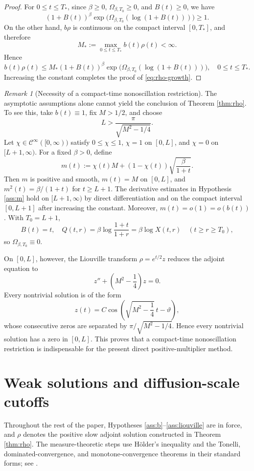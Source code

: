 \documentclass[11pt,reqno]{amsart}
\theoremstyle{definition}
\theoremstyle{remark}
\newtheorem{remark}[theorem]{Remark}
\begin{document}
\begin{proof}
		For $0\leq t\leq T_*$, since $\beta\geq0$,
		$\Omega_{\beta,T_0}\geq0$, and $B(t)\geq0$, we have
		$$
		(1+B(t))^\beta
		\exp\bigl(
		\Omega_{\beta,T_0}(\log(1+B(t)))
		\bigr)
		\geq1.
		$$
		On the other hand, $b\rho$ is continuous on the compact interval
		$[0,T_*]$, and therefore
		$$
		M_*:=
		\max_{0\leq t\leq T_*}b(t)\rho(t)<\infty.
		$$
		Hence
		$$
		b(t)\rho(t)
		\leq
		M_*
		(1+B(t))^\beta
		\exp\bigl(
		\Omega_{\beta,T_0}(\log(1+B(t)))
		\bigr),
		\quad 0\leq t\leq T_*.
		$$
		Increasing the constant completes the proof of
		\eqref{eq:rho-growth}.
	\end{proof}
	
	\begin{remark}[Necessity of a compact-time nonoscillation restriction]
		\label{rem:obstruction}
		The asymptotic assumptions alone cannot yield the conclusion of Theorem \ref{thm:rho}. To see this, take $b(t)\equiv1$, fix $M>1/2$, and choose
		$$
		L>\frac{\pi}{\sqrt{M^2-1/4}}.
		$$
		Let $\chi\in \mathcal{C}^\infty([0,\infty))$ satisfy $0\leq\chi\leq1$, $\chi=1$ on $[0,L]$, and $\chi=0$ on $[L+1,\infty)$. For a fixed $\beta>0$, define
		$$
		m(t):=\chi(t)M+(1-\chi(t))\sqrt{\frac{\beta}{1+t}}.
		$$
		Then $m$ is positive and smooth, $m(t)=M$ on $[0,L]$, and $m^2(t)=\beta/(1+t)$ for $t\geq L+1$. The derivative estimates in Hypothesis \ref{ass:m} hold on $[L+1,\infty)$ by direct differentiation and on the compact interval $[0,L+1]$ after increasing the constant. Moreover, $m(t)=o(1)=o(b(t))$. With $T_0=L+1$,
		$$
		B(t)=t,
		\quad
		Q(t,r)=\beta\log\frac{1+t}{1+r}
		=\beta\log X(t,r)
		\quad(t\geq r\geq T_0),
		$$
		so $\Omega_{\beta,T_0}\equiv0$.
		
		On $[0,L]$, however, the Liouville transform $\rho=e^{t/2}z$ reduces the adjoint equation to
		$$
		z''+\left(M^2-\frac14\right)z=0.
		$$
		Every nontrivial solution is of the form
		$$
		z(t)=C\cos\left(\sqrt{M^2-\frac14}\,t-\vartheta\right),
		$$
		whose consecutive zeros are separated by $\pi/\sqrt{M^2-1/4}$. Hence every nontrivial solution has a zero in $[0,L]$. This proves that a compact-time nonoscillation restriction is indispensable for the present direct positive-multiplier method.
	\end{remark}
	
	\section{Weak solutions and diffusion-scale cutoffs} \label{sec:weak-cutoffs}
	
	Throughout the rest of the paper, Hypotheses \ref{ass:b}--\ref{ass:liouville} are in force, and $\rho$ denotes
	the positive slow adjoint solution constructed in Theorem \ref{thm:rho}.
	The measure-theoretic steps use H\"older's inequality and the Tonelli, dominated-convergence, and monotone-convergence theorems in their standard forms; see \cite{Folland1999}.
	
\end{document}
